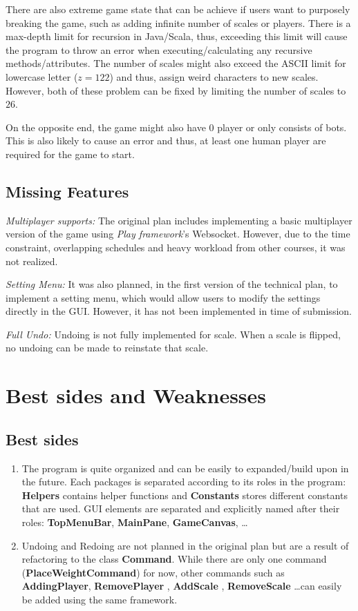 \documentclass[12pt]{article}
\begin{document}
There are also extreme game state that can be achieve if users want to purposely
breaking the game, such as adding infinite number of scales or players. There is
a max-depth limit for recursion in Java/Scala, thus, exceeding this limit will
cause the program to throw an error when executing/calculating any recursive
methods/attributes. The number of scales might also exceed the ASCII limit for
lowercase letter ($z = 122$) and thus, assign weird characters to new scales.
However, both of these problem can be fixed by limiting the number of scales to
$26$.

On the opposite end, the game might also have $0$ player or only consists of
bots. This is also likely to cause an error and thus, at least one human player
are required for the game to start.

\subsection{Missing Features}

\textit{Multiplayer supports:} The original plan includes implementing a basic
multiplayer version of the game using \textit{Play framework}'s Websocket.
However, due to the time constraint, overlapping schedules and heavy workload
from other courses, it was not realized.

\textit{Setting Menu:} It was also planned, in the first version of the
technical plan, to implement a setting menu, which would allow users to modify
the settings directly in the GUI. However, it has not been implemented in time
of submission.

\textit{Full Undo:} Undoing is not fully implemented for scale. When a scale is
flipped, no undoing can be made to reinstate that scale.

\section{Best sides and Weaknesses}

\subsection{Best sides}
\begin{enumerate}
  \item The program is quite organized and can be easily to expanded/build upon
    in the future. Each packages is separated according to its roles in the
    program: \textbf{Helpers} contains helper functions and \textbf{Constants}
    stores different constants that are used. GUI elements are separated and
    explicitly named after their roles: \textbf{TopMenuBar}, \textbf{MainPane},
    \textbf{GameCanvas}, \dots 
  \item Undoing and Redoing are not planned in the original plan but are a
    result of refactoring to the class \textbf{Command}. While there are only
    one command (\textbf{PlaceWeightCommand}) for now, other commands such as
    \textbf{AddingPlayer}, \textbf{RemovePlayer} , \textbf{AddScale} ,
    \textbf{RemoveScale} \dots can easily be added using the same framework.
\end{enumerate}
\end{document}
